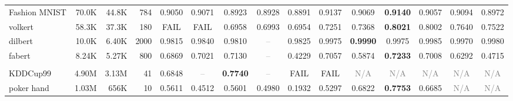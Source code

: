 \begin{table}[t]
{\begin{tabular}{lrrrccccccccccc}
Fashion MNIST & 70.0K & 44.8K & 784 & \cellcolor[HTML]{F4F0CE}0.9050 & \cellcolor[HTML]{EEEECF}0.9071 & \cellcolor[HTML]{F7D6CC}0.8923 & \cellcolor[HTML]{F7D7CC}0.8928 & \cellcolor[HTML]{F4CCCC}0.8891 & \cellcolor[HTML]{DAEAD3}0.9137 & \cellcolor[HTML]{EFEFCF}0.9069 & \cellcolor[HTML]{D9EAD3}\textbf{0.9140} & \cellcolor[HTML]{F2EFCE}0.9057 & \cellcolor[HTML]{E7EDD0}0.9094 & \cellcolor[HTML]{FBE5CC}0.8972 \\
volkert & 58.3K & 37.3K & 180 & \textcolor{red!70!black}{FAIL} & \textcolor{red!70!black}{FAIL} & \cellcolor[HTML]{F4CCCC}0.6958 & \cellcolor[HTML]{F5CFCC}0.6993 & \cellcolor[HTML]{F4CCCC}0.6954 & \cellcolor[HTML]{FAE1CC}0.7251 & \cellcolor[HTML]{FDE9CC}0.7368 & \cellcolor[HTML]{D9EAD3}\textbf{0.8021} & \cellcolor[HTML]{DAEAD3}0.8002 & \cellcolor[HTML]{F4F0CE}0.7640 & \cellcolor[HTML]{FDF1CC}0.7522 \\
dilbert & 10.0K & 6.40K & 2000 & \cellcolor[HTML]{F5CECC}0.9815 & \cellcolor[HTML]{F8D9CC}0.9840 & \cellcolor[HTML]{F4CCCC}0.9810 & \textcolor{gray}{--} & \cellcolor[HTML]{F6D2CC}0.9825 & \cellcolor[HTML]{DFEBD2}0.9975 & \cellcolor[HTML]{D9EAD3}\textbf{0.9990} & \cellcolor[HTML]{DFEBD2}0.9975 & \cellcolor[HTML]{DBEAD3}0.9985 & \cellcolor[HTML]{E1ECD1}0.9970 & \cellcolor[HTML]{DDEBD2}0.9980 \\
fabert & 8.24K & 5.27K & 800 & \cellcolor[HTML]{E2ECD1}0.6869 & \cellcolor[HTML]{DEEBD2}0.7021 & \cellcolor[HTML]{DCEBD3}0.7130 & \textcolor{gray}{--} & \cellcolor[HTML]{F4CCCC}0.4229 & \cellcolor[HTML]{DDEBD2}0.7057 & \cellcolor[HTML]{FBF1CD}0.5874 & \cellcolor[HTML]{D9EAD3}\textbf{0.7233} & \cellcolor[HTML]{DFEBD2}0.7008 & \cellcolor[HTML]{F1EFCF}0.6292 & \cellcolor[HTML]{F8D8CC}0.4715 \\
\addlinespace[2pt]
\rowcolor{gray!15}
\multicolumn{15}{l}{\textbf{Balanced Accuracy}} \\
KDDCup99 & 4.90M & 3.13M & 41 & \cellcolor[HTML]{F4CCCC}0.6848 & \textcolor{gray}{--} & \cellcolor[HTML]{D9EAD3}\textbf{0.7740} & \textcolor{gray}{--} & \textcolor{red!70!black}{FAIL} & \textcolor{red!70!black}{FAIL} & \textcolor{gray}{N/A} & \textcolor{gray}{N/A} & \textcolor{gray}{N/A} & \textcolor{gray}{N/A} & \textcolor{gray}{N/A} \\
poker hand & 1.03M & 656K & 10 & \cellcolor[HTML]{F5F0CE}0.5611 & \cellcolor[HTML]{FEEECC}0.4512 & \cellcolor[HTML]{F5F0CE}0.5601 & \cellcolor[HTML]{FDF2CC}0.4980 & \cellcolor[HTML]{F4CCCC}0.1932 & \cellcolor[HTML]{F9F1CD}0.5297 & \cellcolor[HTML]{E5EDD1}0.6822 & \cellcolor[HTML]{D9EAD3}\textbf{0.7753} & \cellcolor[HTML]{E7EDD0}0.6685 & \textcolor{gray}{N/A} & \textcolor{gray}{N/A} \\

\end{tabular}}
\end{table}
